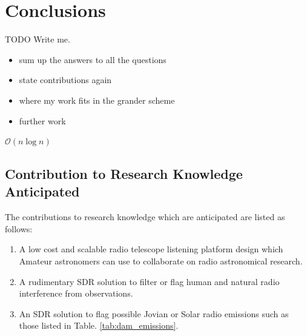 \documentclass[runningheads,a4paper]{llncs}
\begin{document}
%
%
\newpage
\chapter*{Conclusions}
TODO Write me.

\begin{itemize}
  \item sum up the answers to all the questions
  \item state contributions again
  \item where my work fits in the grander scheme
  \item further work
\end{itemize}

$\mathcal{O}(n\log{}n)$

\citep{octave-09} \citep{RSGB-14}

%
%
\newpage
\section*{Contribution to Research Knowledge Anticipated}

The contributions to research knowledge which are anticipated are listed as follows:

\begin{enumerate}
  \item A low cost and scalable radio telescope listening platform design which Amateur astronomers can use to collaborate on radio astronomical research.
  \item A rudimentary \gls{SDR} solution to filter or flag human and natural radio interference from observations.
  \item An \gls{SDR} solution to flag possible Jovian or Solar radio emissions such as those listed in Table. \ref{tab:dam_emissions}.
\end{enumerate} 


%
\appendix
\end{document}
